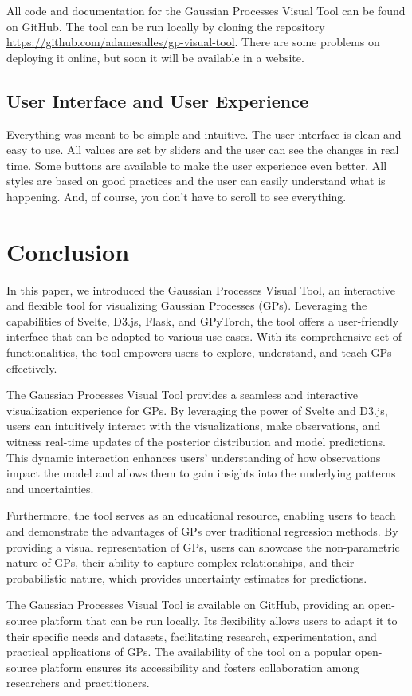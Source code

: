 \documentclass[preprint,journal]{vgtc}       %
\begin{document}
All code and documentation for the Gaussian Processes Visual Tool can be found on GitHub. The tool can be run locally by cloning the repository \url{https://github.com/adamesalles/gp-visual-tool}. There are some problems on deploying it online, but soon it will be available in a website.

\subsection{User Interface and User Experience}

Everything was meant to be simple and intuitive. The user interface is clean and easy to use. All values are set by sliders and the user can see the changes in real time. Some buttons are available to make the user experience even better. All styles are based on good practices and the user can easily understand what is happening. And, of course, you don't have to scroll to see everything.

\section{Conclusion}
In this paper, we introduced the Gaussian Processes Visual Tool, an interactive and flexible tool for visualizing Gaussian Processes (GPs). Leveraging the capabilities of Svelte, D3.js, Flask, and GPyTorch, the tool offers a user-friendly interface that can be adapted to various use cases. With its comprehensive set of functionalities, the tool empowers users to explore, understand, and teach GPs effectively.

The Gaussian Processes Visual Tool provides a seamless and interactive visualization experience for GPs. By leveraging the power of Svelte and D3.js, users can intuitively interact with the visualizations, make observations, and witness real-time updates of the posterior distribution and model predictions. This dynamic interaction enhances users' understanding of how observations impact the model and allows them to gain insights into the underlying patterns and uncertainties.

Furthermore, the tool serves as an educational resource, enabling users to teach and demonstrate the advantages of GPs over traditional regression methods. By providing a visual representation of GPs, users can showcase the non-parametric nature of GPs, their ability to capture complex relationships, and their probabilistic nature, which provides uncertainty estimates for predictions.

The Gaussian Processes Visual Tool is available on GitHub, providing an open-source platform that can be run locally. Its flexibility allows users to adapt it to their specific needs and datasets, facilitating research, experimentation, and practical applications of GPs. The availability of the tool on a popular open-source platform ensures its accessibility and fosters collaboration among researchers and practitioners.
\end{document}
